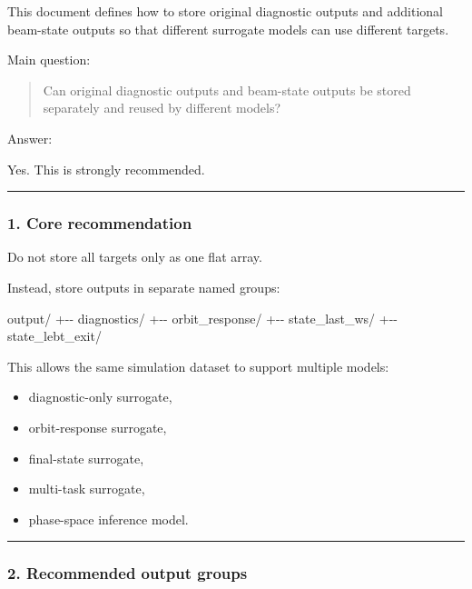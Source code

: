 \documentclass[
]{article}
\newenvironment{Shaded}{}{}
\newcommand{\NormalTok}[1]{#1}
\providecommand{\tightlist}{%
  \setlength{\itemsep}{0pt}\setlength{\parskip}{0pt}}
\begin{document}
This document defines how to store original diagnostic outputs and
additional beam-state outputs so that different surrogate models can use
different targets.

Main question:

\begin{quote}
Can original diagnostic outputs and beam-state outputs be stored
separately and reused by different models?
\end{quote}

Answer:

Yes. This is strongly recommended.

\begin{center}\rule{0.5\linewidth}{0.5pt}\end{center}

\hypertarget{core-recommendation}{%
\subsubsection{1. Core recommendation}\label{core-recommendation}}

Do not store all targets only as one flat array.

Instead, store outputs in separate named groups:

\begin{Shaded}
\begin{Highlighting}[]
\NormalTok{output/}
\NormalTok{+{-}{-} diagnostics/}
\NormalTok{+{-}{-} orbit\_response/}
\NormalTok{+{-}{-} state\_last\_ws/}
\NormalTok{+{-}{-} state\_lebt\_exit/}
\end{Highlighting}
\end{Shaded}

This allows the same simulation dataset to support multiple models:

\begin{itemize}
\tightlist
\item
  diagnostic-only surrogate,
\item
  orbit-response surrogate,
\item
  final-state surrogate,
\item
  multi-task surrogate,
\item
  phase-space inference model.
\end{itemize}

\begin{center}\rule{0.5\linewidth}{0.5pt}\end{center}

\hypertarget{recommended-output-groups}{%
\subsubsection{2. Recommended output
groups}\label{recommended-output-groups}}
\end{document}
